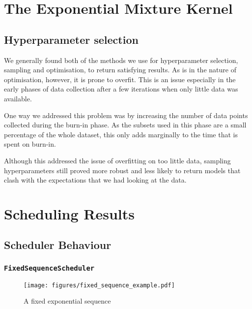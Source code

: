\documentclass[a4paper,12pt,twoside,openright]{report}
\begin{document}
\section{The Exponential Mixture Kernel}

\subsection{Hyperparameter selection}
We generally found both of the methods we use for hyperparameter selection, sampling and optimisation, to return satisfying results. As is in the nature of optimisation, however, it is prone to overfit. This is an issue especially in the early phases of data collection after a few iterations when only little data was available.

One way we addressed this problem was by increasing the number of data points collected during the burn-in phase. As the subsets used in this phase are a small percentage of the whole dataset, this only adds marginally to the time that is spent on burn-in.

Although this addressed the issue of overfitting on too little data, sampling hyperparameters still proved more robust and less likely to return models that clash with the expectations that we had looking at the data.




\section{Scheduling Results}


\subsection{Scheduler Behaviour}


\subsubsection{\texttt{FixedSequenceScheduler}}
\begin{figure}
\centering
  \texttt{[image: figures/fixed\_sequence\_example.pdf]}
  \caption{A fixed exponential sequence}
  \label{fixedsequenceexample}
\end{figure}
\end{document}
